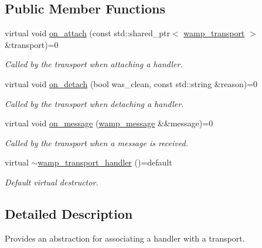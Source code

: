 \subsection*{Public Member Functions}
\begin{DoxyCompactItemize}
\item 
virtual void \hyperlink{classautobahn_1_1wamp__transport__handler_ad931e9199fd0f138db0a21bebeafac96}{on\+\_\+attach} (const std\+::shared\+\_\+ptr$<$ \hyperlink{classautobahn_1_1wamp__transport}{wamp\+\_\+transport} $>$ \&transport)=0
\begin{DoxyCompactList}\small\item\em Called by the transport when attaching a handler. \end{DoxyCompactList}\item 
virtual void \hyperlink{classautobahn_1_1wamp__transport__handler_aa42e0c0bfdfca5b35d0c249539f8deea}{on\+\_\+detach} (bool was\+\_\+clean, const std\+::string \&reason)=0
\begin{DoxyCompactList}\small\item\em Called by the transport when detaching a handler. \end{DoxyCompactList}\item 
virtual void \hyperlink{classautobahn_1_1wamp__transport__handler_ad7e506952de0a3c5b86d4d17a2baa2b5}{on\+\_\+message} (\hyperlink{classautobahn_1_1wamp__message}{wamp\+\_\+message} \&\&message)=0
\begin{DoxyCompactList}\small\item\em Called by the transport when a message is received. \end{DoxyCompactList}\item 
virtual \hyperlink{classautobahn_1_1wamp__transport__handler_aa98540474a0fa1d79012d73fd1b74a7a}{$\sim$wamp\+\_\+transport\+\_\+handler} ()=default\hypertarget{classautobahn_1_1wamp__transport__handler_aa98540474a0fa1d79012d73fd1b74a7a}{}\label{classautobahn_1_1wamp__transport__handler_aa98540474a0fa1d79012d73fd1b74a7a}

\begin{DoxyCompactList}\small\item\em Default virtual destructor. \end{DoxyCompactList}\end{DoxyCompactItemize}


\subsection{Detailed Description}
Provides an abstraction for associating a handler with a transport. 

